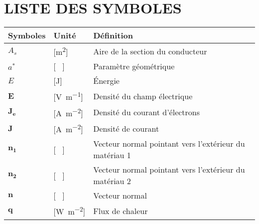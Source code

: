 \chapter*{LISTE DES SYMBOLES}
\pagestyle{pagenumber}
%

%
\begin{longtable}{l p{2.5cm} p{4in}}
	\textbf{Symboles} & \textbf{Unité}                                      & \textbf{Définition}                                                                   \\
	\endhead
	$A_s$             & [\si{\square\metre}]                                & Aire de la section du conducteur                                                      \\
	$a^*$             & [ \ ]                                               & Paramètre géométrique                                                                 \\
	$E$               & [\si{\joule}]                                       & Énergie                                                                               \\
	$\mathbf{E}$      & [\si{\volt\per\metre}]                              & Densité du champ électrique                                                           \\
	$\mathbf{J_e}$    & [\si{\ampere\per\square\metre}]                     & Densité du courant d'électrons                                                        \\
	$\mathbf{J}$      & [\si{\ampere\per\square\metre}]                     & Densité de courant                                                                    \\
	$\mathbf{n_1}$    & [ \ ]                                               & Vecteur normal pointant vers l'extérieur du matériau 1                                \\
	$\mathbf{n_2}$    & [ \ ]                                               & Vecteur normal pointant vers l'extérieur du matériau 2                                \\
	$\mathbf{n}$      & [ \ ]                                               & Vecteur normal                                                                        \\
	$\mathbf{q}$      & [\si{\watt\per\square\metre}]                       & Flux de chaleur                                                                       \\

\end{longtable}
